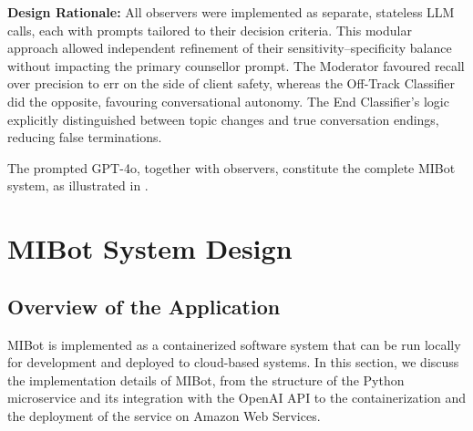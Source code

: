 \textbf{Design Rationale:} All observers were implemented as separate, stateless LLM calls, each with prompts tailored to their decision criteria. This modular approach allowed independent refinement of their sensitivity–specificity balance without impacting the primary counsellor prompt. The Moderator favoured recall over precision to err on the side of client safety, whereas the Off-Track Classifier did the opposite, favouring conversational autonomy. The End Classifier's logic explicitly distinguished between topic changes and true conversation endings, reducing false terminations.

The prompted GPT-4o, together with observers, constitute the complete MIBot system, as
illustrated in .

\section{MIBot System Design}
\label{sec:deployment}

\subsection{Overview of the Application}

MIBot is implemented as a containerized software system that can be run locally for
development and deployed to cloud-based systems. In this section, we discuss the
implementation details of MIBot, from the structure of the Python microservice and its
integration with the OpenAI API to the containerization and the deployment of the
service on Amazon Web Services.

